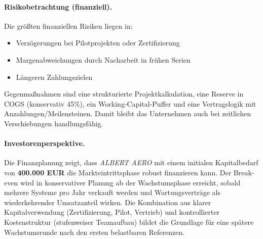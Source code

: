 \documentclass[11pt,a4paper]{article}
\begin{document}
\paragraph{Risikobetrachtung (finanziell).}
Die größten finanziellen Risiken liegen in:
\begin{itemize}
    \item Verzögerungen bei Pilotprojekten oder Zertifizierung
    \item Margenabweichungen durch Nacharbeit in frühen Serien
    \item Längeren Zahlungszielen
\end{itemize}
Gegenmaßnahmen sind eine strukturierte Projektkalkulation, eine Reserve in COGS (konservativ 45\%), ein Working-Capital-Puffer und eine Vertragslogik mit Anzahlungen/Meilensteinen. Damit bleibt das Unternehmen auch bei zeitlichen Verschiebungen handlungsfähig.

\paragraph{Investorenperspektive.}
Die Finanzplanung zeigt, dass \textit{ALBERT AERO} mit einem initialen Kapitalbedarf von \textbf{400.000 EUR} die Markteintrittsphase robust finanzieren kann. Der Break-even wird in konservativer Planung ab der Wachstumsphase erreicht, sobald mehrere Systeme pro Jahr verkauft werden und Wartungsverträge als wiederkehrender Umsatzanteil wirken. Die Kombination aus klarer Kapitalverwendung (Zertifizierung, Pilot, Vertrieb) und kontrollierter Kostenstruktur (stufenweiser Teamaufbau) bildet die Grundlage für eine spätere Wachstumsrunde nach den ersten belastbaren Referenzen.

\end{document}
